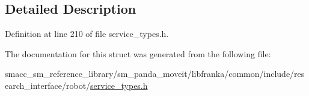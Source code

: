 \subsection{Detailed Description}


Definition at line 210 of file service\+\_\+types.\+h.



The documentation for this struct was generated from the following file\+:\begin{DoxyCompactItemize}
\item 
smacc\+\_\+sm\+\_\+reference\+\_\+library/sm\+\_\+panda\+\_\+moveit/libfranka/common/include/research\+\_\+interface/robot/\hyperlink{service__types_8h}{service\+\_\+types.\+h}\end{DoxyCompactItemize}
